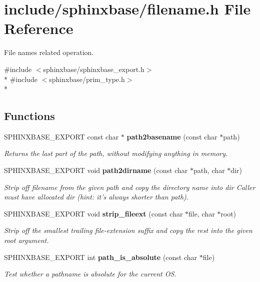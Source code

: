 \section{include/sphinxbase/filename.h File Reference}
\label{filename_8h}


File names related operation.  


{\ttfamily \#include $<$sphinxbase/sphinxbase\-\_\-export.\-h$>$}\\*
{\ttfamily \#include $<$sphinxbase/prim\-\_\-type.\-h$>$}\\*
\subsection*{Functions}
\begin{DoxyCompactItemize}
\item 
S\-P\-H\-I\-N\-X\-B\-A\-S\-E\-\_\-\-E\-X\-P\-O\-R\-T const char $\ast$ {\bf path2basename} (const char $\ast$path)\label{filename_8h_a532f0fe8616b8c447f82644c1cac7806}

\begin{DoxyCompactList}\small\item\em Returns the last part of the path, without modifying anything in memory. \end{DoxyCompactList}\item 
S\-P\-H\-I\-N\-X\-B\-A\-S\-E\-\_\-\-E\-X\-P\-O\-R\-T void {\bf path2dirname} (const char $\ast$path, char $\ast$dir)\label{filename_8h_a678be92ddb74695f26a9e4f527b073b0}

\begin{DoxyCompactList}\small\item\em Strip off filename from the given path and copy the directory name into dir Caller must have allocated dir (hint\-: it's always shorter than path). \end{DoxyCompactList}\item 
S\-P\-H\-I\-N\-X\-B\-A\-S\-E\-\_\-\-E\-X\-P\-O\-R\-T void {\bf strip\-\_\-fileext} (const char $\ast$file, char $\ast$root)
\begin{DoxyCompactList}\small\item\em Strip off the smallest trailing file-\/extension suffix and copy the rest into the given root argument. \end{DoxyCompactList}\item 
S\-P\-H\-I\-N\-X\-B\-A\-S\-E\-\_\-\-E\-X\-P\-O\-R\-T int {\bf path\-\_\-is\-\_\-absolute} (const char $\ast$file)\label{filename_8h_ac59add2db73b33e81b354de114268e7a}

\begin{DoxyCompactList}\small\item\em Test whether a pathname is absolute for the current O\-S. \end{DoxyCompactList}\end{DoxyCompactItemize}


